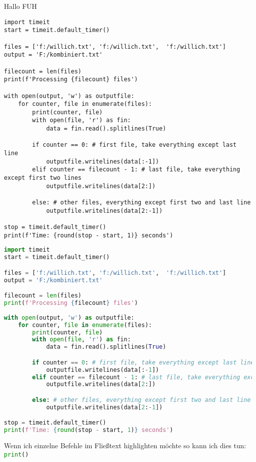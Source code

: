 \documentclass[12pt,ngerman,parskip=half]{scrartcl}
\begin{document}
Hallo FUH

\begin{lstlisting}
import timeit
start = timeit.default_timer()

files = ['f:/willich.txt', 'f:/willich.txt',  'f:/willich.txt']
output = 'F:/kombiniert.txt'

filecount = len(files)
print(f'Processing {filecount} files')
 
with open(output, 'w') as outputfile:
    for counter, file in enumerate(files):
        print(counter, file)
        with open(file, 'r') as fin:
            data = fin.read().splitlines(True)

        if counter == 0: # first file, take everything except last line
            outputfile.writelines(data[:-1])
        elif counter == filecount - 1: # last file, take everything except first two lines
            outputfile.writelines(data[2:])

        else: # other files, everything except first two and last line
            outputfile.writelines(data[2:-1])

stop = timeit.default_timer()
print(f'Time: {round(stop - start, 1)} seconds')  
\end{lstlisting}

\clearpage

\begin{lstlisting}[language={Python},morekeywords={default_timer,read,splitlines,writelines}]
import timeit
start = timeit.default_timer()

files = ['f:/willich.txt', 'f:/willich.txt',  'f:/willich.txt']
output = 'F:/kombiniert.txt'

filecount = len(files)
print(f'Processing {filecount} files')
 
with open(output, 'w') as outputfile:
    for counter, file in enumerate(files):
        print(counter, file)
        with open(file, 'r') as fin:
            data = fin.read().splitlines(True)

        if counter == 0: # first file, take everything except last line
            outputfile.writelines(data[:-1])
        elif counter == filecount - 1: # last file, take everything except first two lines
            outputfile.writelines(data[2:])

        else: # other files, everything except first two and last line
            outputfile.writelines(data[2:-1])

stop = timeit.default_timer()
print(f'Time: {round(stop - start, 1)} seconds')  
\end{lstlisting}

Wenn ich einzelne Befehle im Fließtext highlighten möchte so kann ich dies tun: \lstinline[language={Python}]{print()}

\clearpage


\end{document}
